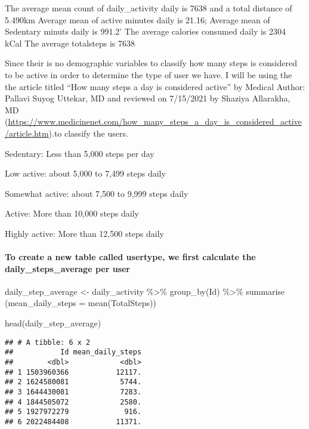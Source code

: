 \documentclass[
]{article}
\newenvironment{Shaded}{\begin{snugshade}}{\end{snugshade}}
\newcommand{\AttributeTok}[1]{\textcolor[rgb]{0.77,0.63,0.00}{#1}}
\newcommand{\FunctionTok}[1]{\textcolor[rgb]{0.00,0.00,0.00}{#1}}
\newcommand{\NormalTok}[1]{#1}
\newcommand{\OtherTok}[1]{\textcolor[rgb]{0.56,0.35,0.01}{#1}}
\newcommand{\SpecialCharTok}[1]{\textcolor[rgb]{0.00,0.00,0.00}{#1}}
\begin{document}
The average mean count of daily\_activity daily is 7638 and a total
distance of 5.490km Average mean of active minutes daily is 21.16;
Average mean of Sedentary minuts daily is 991.2' The average calories
consumed daily is 2304 kCal The average totalsteps is 7638

Since their is no demographic variables to classify how many steps is
considered to be active in order to determine the type of user we have.
I will be using the the article titled ``How many steps a day is
considered active'' by Medical Author: Pallavi Suyog Uttekar, MD and
reviewed on 7/15/2021 by Shaziya Allarakha, MD
(\url{https://www.medicinenet.com/how_many_steps_a_day_is_considered_active/article.htm}).to
classify the users.

Sedentary: Less than 5,000 steps per day

Low active: about 5,000 to 7,499 steps daily

Somewhat active: about 7,500 to 9,999 steps daily

Active: More than 10,000 steps daily

Highly active: More than 12,500 steps daily

\hypertarget{to-create-a-new-table-called-usertype-we-first-calculate-the-daily_steps_average-per-user}{%
\paragraph{To create a new table called usertype, we first calculate the
daily\_steps\_average per
user}\label{to-create-a-new-table-called-usertype-we-first-calculate-the-daily_steps_average-per-user}}

\begin{Shaded}
\begin{Highlighting}[]
\NormalTok{daily\_step\_average }\OtherTok{\textless{}{-}}\NormalTok{ daily\_activity }\SpecialCharTok{\%\textgreater{}\%} 
  \FunctionTok{group\_by}\NormalTok{(Id) }\SpecialCharTok{\%\textgreater{}\%} 
  \FunctionTok{summarise}\NormalTok{ (}\AttributeTok{mean\_daily\_steps =} \FunctionTok{mean}\NormalTok{(TotalSteps))}


\FunctionTok{head}\NormalTok{(daily\_step\_average)}
\end{Highlighting}
\end{Shaded}

\begin{verbatim}
## # A tibble: 6 x 2
##           Id mean_daily_steps
##        <dbl>            <dbl>
## 1 1503960366           12117.
## 2 1624580081            5744.
## 3 1644430081            7283.
## 4 1844505072            2580.
## 5 1927972279             916.
## 6 2022484408           11371.
\end{verbatim}
\end{document}
